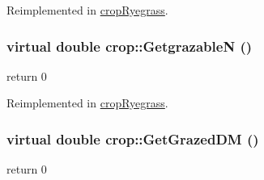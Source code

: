 Reimplemented in \hyperlink{classcrop_ryegrass_ae0b4f4270bb1cc5d47751bb999816ad7}{cropRyegrass}.\hypertarget{classcrop_a771d3a2885d168f4f06686cc7868cad8}{
\subsubsection[{GetgrazableN}]{\setlength{\rightskip}{0pt plus 5cm}virtual double crop::GetgrazableN ()}}
\label{classcrop_a771d3a2885d168f4f06686cc7868cad8}


return 0 

Reimplemented in \hyperlink{classcrop_ryegrass_a158a56a14a1b65c246b9dc87b736feb0}{cropRyegrass}.\hypertarget{classcrop_a1aafdf75bbeabd5e961678d20b487976}{
\subsubsection[{GetGrazedDM}]{\setlength{\rightskip}{0pt plus 5cm}virtual double crop::GetGrazedDM ()}}
\label{classcrop_a1aafdf75bbeabd5e961678d20b487976}


return 0 

